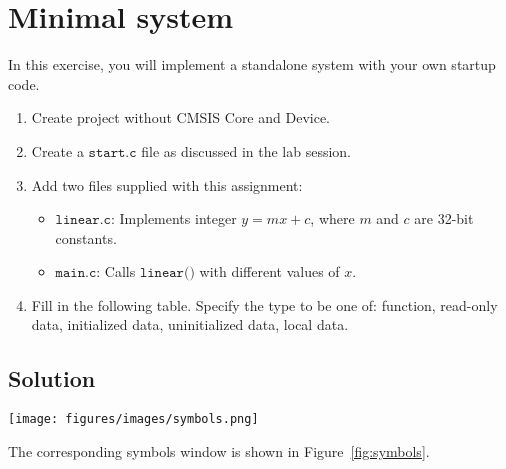 \section*{Minimal system}

In this exercise, you will implement a standalone system with your own startup code.

\begin{enumerate}[itemsep=0pt]
    \item Create project without CMSIS Core and Device.
    \item Create a \(\texttt{start.c}\) file as discussed in the lab session.
    \item Add two files supplied with this assignment:
          \begin{itemize}
              \item \(\texttt{linear.c}\): Implements integer \(y = mx + c\), where \(m\) and \(c\) are 32-bit constants.
              \item \(\texttt{main.c}\): Calls \(\texttt{linear()}\) with diﬀerent values of \(x\).
          \end{itemize}
    \item Fill in the following table.
          Specify the type to be one of:
          function, read-only data, initialized data, uninitialized data, local data.
\end{enumerate}

\subsection*{Solution}

\begin{table}[htbp]
    \centering
    
\end{table}

\begin{figure*}[htbp]
    \centering
    \texttt{[image: figures/images/symbols.png]}
    \caption{
        Symbols window
    }\label{fig:symbols}
\end{figure*}

The corresponding symbols window is shown in Figure~\ref{fig:symbols}.
